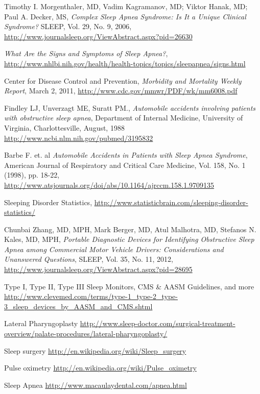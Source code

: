 \begin{thebibliography}{99999}
\singlespace\normalsize

 Timothy I. Morgenthaler, MD, Vadim Kagramanov, MD; Viktor Hanak, MD; Paul A. Decker, MS, \textit{Complex Sleep Apnea Syndrome: Is It a Unique Clinical Syndrome?} SLEEP, Vol. 29, No. 9, 2006, \url{http://www.journalsleep.org/ViewAbstract.aspx?pid=26630}

 \textit{What Are the Signs and Symptoms of Sleep Apnea?}, \url{http://www.nhlbi.nih.gov/health/health-topics/topics/sleepapnea/signs.html}

 Center for Disease Control and Prevention, \textit{Morbidity and Mortality Weekly Report}, March 2, 2011, \url{http://www.cdc.gov/mmwr/PDF/wk/mm6008.pdf}

 Findley LJ, Unverzagt ME, Suratt PM., \textit{Automobile accidents involving patients with obstructive sleep apnea}, Department of Internal Medicine, University of Virginia, Charlottesville, August, 1988  \url{http://www.ncbi.nlm.nih.gov/pubmed/3195832}

 Barbe F. et. al \textit{Automobile Accidents in Patients with Sleep Apnea Syndrome}, American Journal of Respiratory and Critical Care Medicine, Vol. 158, No. 1 (1998), pp. 18-22, \url{http://www.atsjournals.org/doi/abs/10.1164/ajrccm.158.1.9709135}

 Sleeping Disorder Statistics, \url{http://www.statisticbrain.com/sleeping-disorder-statistics/}

 Chunbai Zhang, MD, MPH, Mark Berger, MD, Atul Malhotra, MD, Stefanos N. Kales, MD, MPH, \textit{Portable Diagnostic Devices for Identifying Obstructive Sleep Apnea among Commercial Motor Vehicle Drivers: Considerations and Unanswered Questions}, SLEEP, Vol. 35, No. 11, 2012, \url{http://www.journalsleep.org/ViewAbstract.aspx?pid=28695}

 Type I, Type II, Type III Sleep Monitors, CMS \& AASM Guidelines, and more \url{http://www.clevemed.com/terms/type-1_type-2_type-3_sleep_devices_by_AASM_and_CMS.shtml}

 Lateral Pharyngoplasty \url{http://www.sleep-doctor.com/surgical-treatment-overview/palate-procedures/lateral-pharyngoplasty/}

 Sleep surgery \url{http://en.wikipedia.org/wiki/Sleep_surgery}

 Pulse oximetry \url{http://en.wikipedia.org/wiki/Pulse_oximetry}

 Sleep Apnea \url{http://www.macaulaydental.com/apnea.html}


\end{thebibliography}
